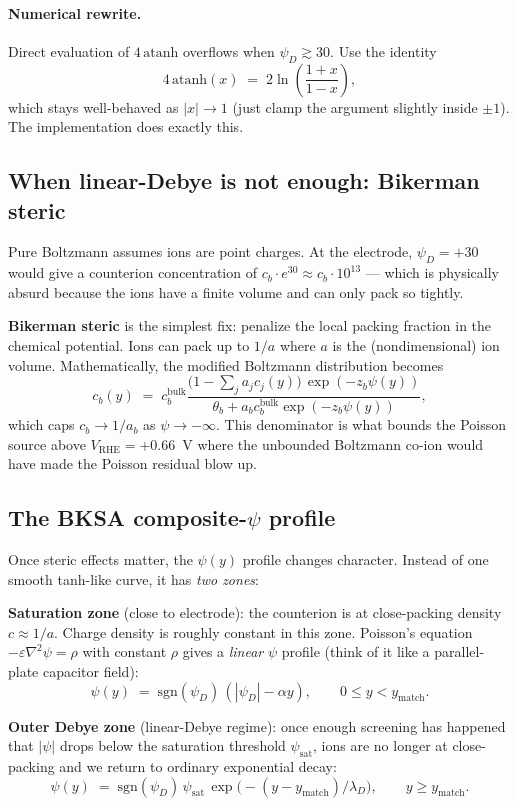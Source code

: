 \documentclass[11pt]{article}
\newcommand{\VRHE}{V_{\mathrm{RHE}}}
\newcommand{\lD}{\lambda_D}
\begin{document}
\paragraph{Numerical rewrite.} Direct evaluation of $4\,\mathrm{atanh}$
overflows when $\psi_D \gtrsim 30$. Use the identity
\[
  4\,\mathrm{atanh}(x) \;=\; 2\ln\!\left(\frac{1+x}{1-x}\right),
\]
which stays well-behaved as $|x| \to 1$ (just clamp the argument
slightly inside $\pm 1$). The implementation does exactly this.

\subsection{When linear-Debye is not enough: Bikerman steric}

Pure Boltzmann assumes ions are point charges. At the electrode,
$\psi_D = +30$ would give a counterion concentration of
$c_b \cdot e^{30} \approx c_b \cdot 10^{13}$ --- which is physically
absurd because the ions have a finite volume and can only pack so
tightly.

\textbf{Bikerman steric} is the simplest fix: penalize the local
packing fraction in the chemical potential. Ions can pack up to
$1/a$ where $a$ is the (nondimensional) ion volume. Mathematically,
the modified Boltzmann distribution becomes
\begin{equation}
  c_b(y) \;=\;
     c_b^{\mathrm{bulk}}
     \frac{\bigl(1 - \sum_j a_j c_j(y)\bigr)\,
           \exp(-z_b \psi(y))}
          {\theta_b + a_b c_b^{\mathrm{bulk}}\exp(-z_b\psi(y))},
\end{equation}
which caps $c_b \to 1/a_b$ as $\psi \to -\infty$. This denominator
is what bounds the Poisson source above
$\VRHE = +0.66$~V where the unbounded Boltzmann co-ion would have
made the Poisson residual blow up.

\subsection{The BKSA composite-$\psi$ profile}

Once steric effects matter, the $\psi(y)$ profile changes character.
Instead of one smooth tanh-like curve, it has \emph{two zones}:

\begin{tcolorbox}[notebox, title={Two-zone Debye structure under steric saturation}]
\textbf{Saturation zone} (close to electrode): the counterion is at
close-packing density $c \approx 1/a$. Charge density is roughly
constant in this zone. Poisson's equation
$-\varepsilon \nabla^2 \psi = \rho$ with constant $\rho$ gives a
\emph{linear} $\psi$ profile (think of it like a parallel-plate
capacitor field):
\[
  \psi(y) \;=\; \mathrm{sgn}(\psi_D)\,(|\psi_D| - \alpha y),
  \qquad 0 \le y < y_{\mathrm{match}}.
\]

\textbf{Outer Debye zone} (linear-Debye regime): once enough screening
has happened that $|\psi|$ drops below the saturation threshold
$\psi_{\mathrm{sat}}$, ions are no longer at close-packing and we
return to ordinary exponential decay:
\[
  \psi(y) \;=\; \mathrm{sgn}(\psi_D)\,\psi_{\mathrm{sat}}\,
                \exp\!\bigl(-(y - y_{\mathrm{match}})/\lD\bigr),
  \qquad y \ge y_{\mathrm{match}}.
\]
\end{tcolorbox}
\end{document}
